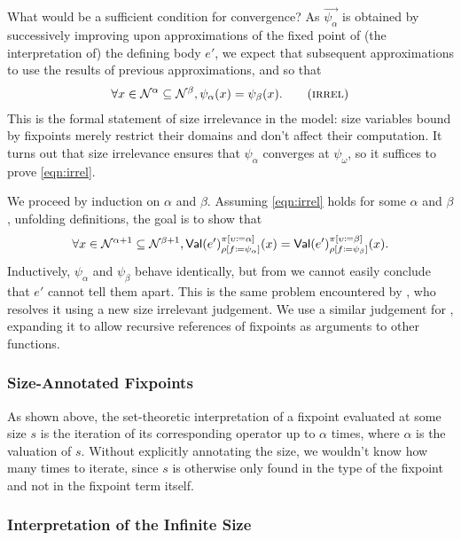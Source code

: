 What would be a sufficient condition for convergence?  As
$\vec{\psi_\alpha}$ is obtained by successively improving upon
approximations of the fixed point of (the interpretation of) the
defining body $e'$, we expect that subsequent approximations to use
the results of previous approximations, and so that
\begin{align*}
  \forall x \in \McN^\alpha \subseteq \McN^\beta, \psi_\alpha(x) = \psi_\beta(x).
  \label{eqn:irrel}\tag{\textsc{irrel}}
\end{align*}
This is the formal statement of size irrelevance in the model:
size variables bound by fixpoints merely restrict their domains and don't
affect their computation.
It turns out that size irrelevance ensures that $\psi_\alpha$
converges at $\psi_\omega$,
so it suffices to prove \eqref{eqn:irrel}.

We proceed by induction on $\alpha$ and $\beta$.
Assuming \eqref{eqn:irrel} holds for some $\alpha$ and $\beta$,
unfolding definitions, the goal is to show that
%
$$\forall x \in \mathcal{N}^{\alpha+1} \subseteq \mathcal{N}^{\beta+1},
  \textsf{Val}(e')_{\rho [f \coloneqq \psi_\alpha]}^{\pi [\upsilon \coloneqq \alpha]}(x) =
  \textsf{Val}(e')_{\rho [f \coloneqq \psi_\beta]}^{\pi [\upsilon \coloneqq \beta]}(x).$$
%
Inductively, $\psi_\alpha$ and $\psi_\beta$ behave identically,
but from  we cannot easily conclude that $e'$ cannot tell
them apart.
This is the same problem encountered by \citet{barras-thesis},
who resolves it using a new size irrelevant judgement.
We use a similar judgement for \langAnother,
expanding it to allow recursive references of fixpoints as arguments
to other functions.

\subsubsection{Size-Annotated Fixpoints}

As shown above, the set-theoretic interpretation of a fixpoint evaluated at some size $s$
is the iteration of its corresponding operator up to $\alpha$ times,
where $\alpha$ is the valuation of $s$.
Without explicitly annotating the size, we wouldn't know how many times to iterate,
since $s$ is otherwise only found in the type of the fixpoint and not in the fixpoint term itself.

\iffalse
\subsubsection{Interpretation of the Infinite Size}

